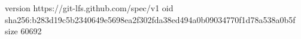 version https://git-lfs.github.com/spec/v1
oid sha256:b283d19c5b2340649e5698ea2f302fda38ed494a0b09034770f1d78a538a0b5f
size 60692
